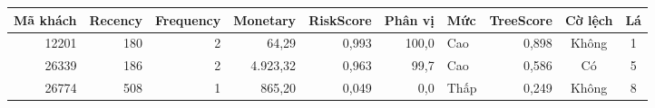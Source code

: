 \begin{tabular}{rrrrrrlrcc}
\toprule
Mã khách & Recency & Frequency & Monetary & RiskScore & Phân vị & Mức & TreeScore & Cờ lệch & Lá \\
\midrule
12201 & 180 & 2 & 64,29 & 0,993 & 100,0 & Cao & 0,898 & Không & 1 \\
26339 & 186 & 2 & 4.923,32 & 0,963 & 99,7 & Cao & 0,586 & Có & 5 \\
26774 & 508 & 1 & 865,20 & 0,049 & 0,0 & Thấp & 0,249 & Không & 8 \\
\bottomrule
\end{tabular}
